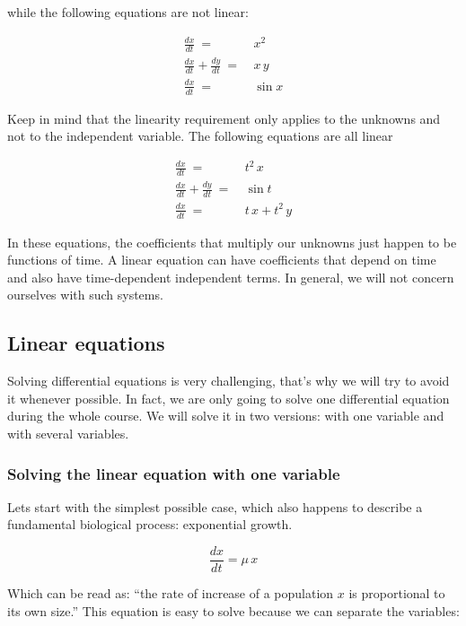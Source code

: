 \documentclass[12pt]{article}
\begin{document}
while the following equations are not linear:

\begin{align}
	\frac{dx}{dt} \: = \: &  x^2	\nonumber\\
	\frac{dx}{dt} + \frac{dy}{dt}\: = \: &  x \, y \nonumber\\
	\frac{dx}{dt} \: = \: &  \sin x \nonumber
\end{align}

Keep in mind that the linearity requirement only applies to the unknowns and not to the independent variable. The following equations are all linear


\begin{align}
	\frac{dx}{dt} \: = \: &  t^2 \, x	\nonumber\\
	\frac{dx}{dt} + \frac{dy}{dt}\: = \: &  \sin t \nonumber\\
	\frac{dx}{dt} \: = \: &  t \, x + t^2 \, y \nonumber
\end{align}

In these equations, the coefficients that multiply our unknowns just happen to be functions of time. A linear equation can have coefficients that depend on time and also have time-dependent independent terms. In general, we will not concern ourselves with such systems.

\subsection{Linear equations}

Solving differential equations is very challenging, that's why we will try to avoid it whenever possible. In fact, we are only going to solve one differential equation during the whole course. We will solve it in two versions: with one variable and with several variables.

\subsubsection{Solving the linear equation with one variable}

Lets start with the simplest possible case, which also happens to describe a fundamental biological process: exponential growth.

\begin{equation}
	\label{odexp}
	\frac{dx}{dt} = \mu \, x 
\end{equation}

Which can be read as: ``the rate of increase of a population $x$ is proportional to its own size.'' This equation is easy to solve because we can separate the variables:
\end{document}
